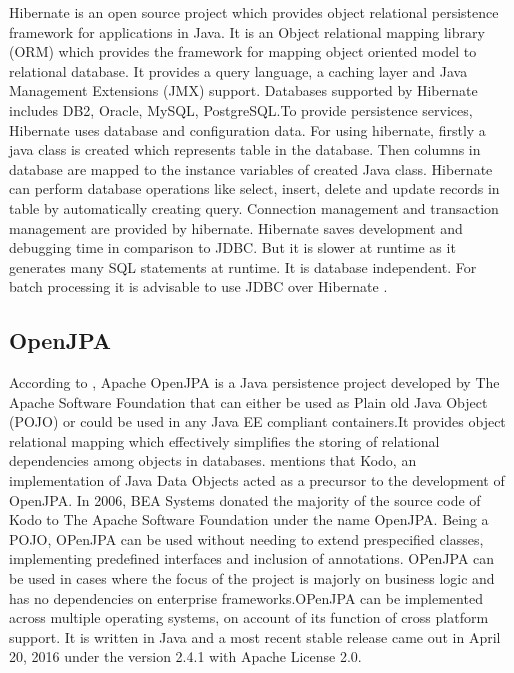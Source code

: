      Hibernate is an open source project which provides object
     relational persistence framework for applications in Java. It is
     an Object relational mapping library (ORM) which provides the
     framework for mapping object oriented model to relational
     database. It provides a query language, a caching layer and Java
     Management Extensions (JMX) support. Databases supported by
     Hibernate includes DB2, Oracle, MySQL, PostgreSQL.To provide
     persistence services, Hibernate uses database and configuration
     data. For using hibernate, firstly a java class is created which
     represents table in the database. Then columns in database are
     mapped to the instance variables of created Java class. Hibernate
     can perform database operations like select, insert, delete and
     update records in table by automatically creating
     query. Connection management and transaction management are
     provided by hibernate.  Hibernate saves development and debugging
     time in comparison to JDBC.  But it is slower at runtime as it
     generates many SQL statements at runtime. It is database
     independent. For batch processing it is advisable to use JDBC
     over Hibernate \cite{www-hibernate}.

\subsection{OpenJPA \cv}

     According to \cite{www-openjpa}, Apache OpenJPA is a Java
     persistence project developed by The Apache Software Foundation that
     can either be used as Plain old Java Object (POJO) or could be used in
     any Java EE compliant containers.It provides object relational mapping
     which effectively simplifies the storing of relational dependencies
     among objects in databases. \cite{www-openjpa-wiki} mentions that
     Kodo, an implementation of Java Data Objects acted as a precursor to
     the development of OpenJPA. In 2006, BEA Systems donated the majority
     of the source code of Kodo to The Apache Software Foundation under the
     name OpenJPA. Being a POJO, OPenJPA can be used without needing to
     extend prespecified classes, implementing predefined interfaces and
     inclusion of annotations. OPenJPA can be used in cases where the focus
     of the project is majorly on business logic and has no dependencies on
     enterprise frameworks.OPenJPA can be implemented across multiple
     operating systems, on account of its function of cross platform
     support. It is written in Java and a most recent stable release came
     out in April 20, 2016 under the version 2.4.1 with Apache License 2.0.


